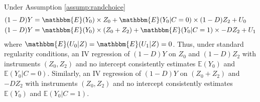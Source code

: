 \begin{prop}
\label{prop:ASBreg}
Under Assumption \ref{assump:randchoice}
\begin{align}
\label{eq:ASB0}
    (1 - D) Y &= \mathbbm{E}(Y_{0}) \times Z_0 + \mathbbm{E}(Y_{0}|C=0) \times (1 - D)Z_2 + U_{0}\\
\label{eq:ASB1}
    (1 - D) Y &= \mathbbm{E}(Y_{0}) \times(Z_0 + Z_2) + \mathbbm{E}(Y_{0}|C=1)\times -DZ_2 + U_{1}
\end{align}
where $\mathbbm{E}(U_0|Z) = \mathbbm{E}(U_1|Z) = 0$.
Thus, under standard regularity conditions, an IV regression of $(1 - D)Y$ on $Z_0$ and $(1 - D)Z_2$ with instruments $(Z_0, Z_2)$ and no intercept consistently estimates $\mathbb{E}(Y_0)$ and $\mathbb{E}(Y_0|C=0)$. 
Similarly, an IV regression of $(1 - D)Y$ on $(Z_0 + Z_2)$ and $-DZ_2$ with instruments $(Z_0, Z_2)$ and no intercept consistently estimates $\mathbb{E}(Y_0)$ and $\mathbb{E}(Y_0|C=1)$.
\end{prop}

